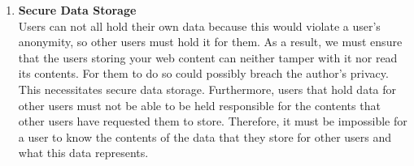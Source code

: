 \begin{enumerate}
    \item{\textbf{Secure Data Storage} \\
Users can not all hold their own data because this would violate a user’s anonymity,
so other users must hold it for them. As a result, we must ensure that the users storing
your web content can neither tamper with it nor read its contents. For them to do so could
possibly breach the author’s privacy. This necessitates secure data storage.
Furthermore, users that hold data for other users must not be able to be held responsible
for the contents that other users have requested them to store. Therefore, it must be
impossible for a user to know the contents of the data that they store for other users
and what this data represents.
        }
\end{enumerate}
